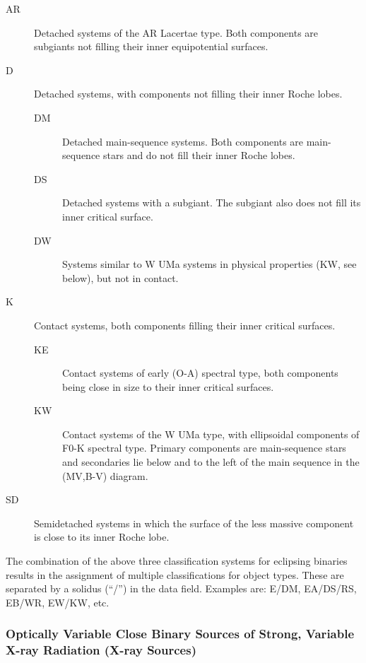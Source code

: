 \begin{description}
\item[AR]     Detached systems of the AR Lacertae type. Both components
              are subgiants not filling their inner equipotential surfaces.
\item[D]      Detached systems, with components not filling their inner Roche lobes.
	\begin{description}
\item[DM]     Detached main-sequence systems. Both components are
              main-sequence stars and do not fill their inner Roche lobes.
\item[DS]     Detached systems with a subgiant. The subgiant also does
              not fill its inner critical surface.
\item[DW]     Systems similar to W UMa systems in physical properties (KW, see below), but not in contact.
	\end{description}
\item[K]      Contact systems, both components filling their inner critical surfaces.
	\begin{description}
\item[KE]     Contact systems of early (O-A) spectral type, both
              components being close in size to their inner critical surfaces.
\item[KW]     Contact systems of the W UMa type, with ellipsoidal
              components of F0-K spectral type. Primary components are main-sequence
              stars and secondaries lie below and to the left of the main sequence in the (MV,B-V) diagram.
	\end{description}
\item[SD]     Semidetached systems in which the surface of the less
              massive component is close to its inner Roche lobe.
\end{description}

The combination of the above three classification systems for eclipsing binaries
results in the assignment of multiple classifications for object types.
These are separated by a solidus (``/'') in the data field. Examples are:
E/DM, EA/DS/RS, EB/WR, EW/KW, etc.

\subsubsection{Optically Variable Close Binary Sources of Strong, Variable X-ray Radiation (X-ray Sources)}
\label{optically-variable-close-binary-sources-of-strong-variable-x-ray-radiation-x-ray-sources}

